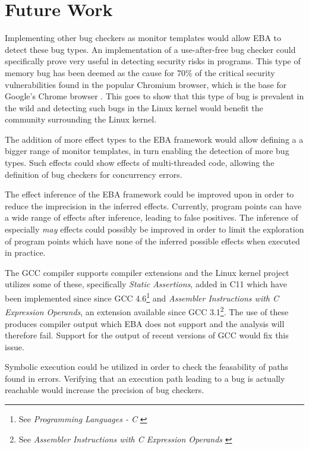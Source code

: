 \section{Future Work}

Implementing other bug checkers as monitor templates would allow EBA to detect these bug types. An implementation of a use-after-free bug checker could specifically prove very useful in detecting security risks in programs. This type of memory bug has been deemed as the cause for 70\% of the critical security vulnerabilities found in the popular Chromium browser, which is the base for Google's Chrome browser \cite{google-use-after-free}. This goes to show that this type of bug is prevalent in the wild and detecting such bugs in the Linux kernel would benefit the community surrounding the Linux kernel.

\newpar The addition of more effect types to the EBA framework would allow defining a a bigger range of monitor templates, in turn enabling the detection of more bug types. Such effects could show effects of multi-threaded code, allowing the definition of bug checkers for concurrency errors. 

\newpar The effect inference of the EBA framework could be improved upon in order to reduce the imprecision in the inferred effects. Currently, program points can have a wide range of effects after inference, leading to false positives. The inference of especially \textit{may} effects could possibly be improved in order to limit the exploration of program points which have none of the inferred possible effects when executed in practice. 

\newpar The GCC compiler supports compiler extensions and the Linux kernel project utilizes some of these, specifically \textit{Static Assertions}, added in C11 which have been implemented since since GCC 4.6\footnote{See \textit{Programming Languages - C} \cite{ISO:2011:IIIb}} and \textit{Assembler Instructions with C Expression Operands}, an extension available since GCC 3.1\footnote{See \textit{Assembler Instructions with C Expression Operands} \cite{GCC:3.1}}. The use of these produces compiler output which EBA does not support and the analysis will therefore fail. Support for the output of recent versions of GCC would fix this issue. 

\newpar Symbolic execution could be utilized in order to check the feasability of paths found in errors. Verifying that an execution path leading to a bug is actually reachable would increase the precision of bug checkers.  

